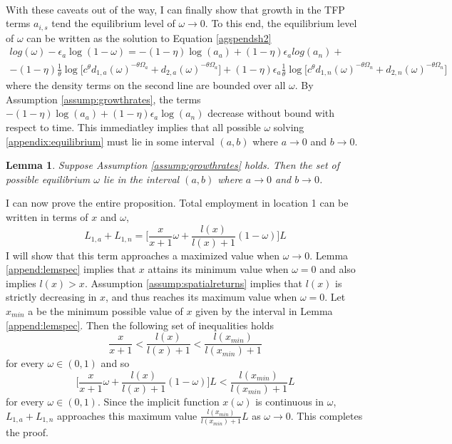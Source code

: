 \documentclass[]{article}
\theoremstyle{plain}
\newtheorem{lem}[thm]{Lemma}
\begin{document}
\paragraph*{}
With these caveats out of the way, I can finally show that growth in the TFP terms $a_{i, s}$ tend the equilibrium level of $\omega \to 0$. To this end, the equilibrium level of $\omega$ can be written as the solution to Equation \eqref{agspendsh2}
\begin{multline}\label{appendix:equilibrium}
log(\omega) - \epsilon_{a}\log(1 -\omega) = -(1-\eta)\log(a_{a}) + (1-\eta)\epsilon_{a}log(a_{n}) + \\ -(1-\eta)\frac{1}{\theta}\log\bigg[c^{\theta}d_{1, a}(\omega)^{-\theta\Omega_{a}} + d_{2, a}(\omega)^{-\theta \Omega_{a}}\bigg] + (1-
\eta)\epsilon_{a}\frac{1}{\theta}\log\bigg[c^{\theta}d_{1, n}(\omega)^{-\theta\Omega_{n}} + d_{2, n}(\omega)^{-\theta \Omega_{n}}\bigg]
\end{multline}
where the density terms on the second line are bounded over all $\omega$. By Assumption \ref{assump:growthrates}, the terms $-(1-\eta)\log(a_{a}) + (1-\eta)\epsilon_{a}\log(a_{n})$ decrease without bound with respect to time. This immediatley implies that all possible $\omega$ solving \eqref{appendix:equilibrium} must lie in some interval $(a, b)$ where $a \to 0$ and $b \to 0$. 
\begin{lem}
	Suppose Assumption \ref{assump:growthrates} holds. Then the set of possible equilibrium $\omega$ lie in the interval $(a, b)$ where $a \to 0$ and $b \to 0$.  
\end{lem}
I can now prove the entire proposition. Total employment in location 1 can be written in terms of $x$ and $\omega$,
\begin{equation}
	L_{1, a} + L_{1, n} = \bigg[\frac{x}{x + 1}\omega + \frac{l(x)}{l(x) + 1}(1-\omega)\bigg]L
\end{equation}
I will show that this term approaches a maximized value when $\omega \to 0$. Lemma \eqref{append:lemspec} implies that $x$ attains its minimum value when $\omega = 0$ and also implies $l(x) > x$. Assumption \ref{assump:spatialreturns} implies that $l(x)$ is strictly decreasing in $x$, and thus reaches its maximum value when $\omega = 0$. Let $x_{min}$ a be the minimum possible value of $x$ given by the interval in Lemma \eqref{append:lemspec}. Then the following set of inequalities holds
\begin{equation}
	\frac{x}{x + 1} < \frac{l(x)}{l(x) + 1} < \frac{l(x_{min})}{l(x_{min}) + 1}
\end{equation}    
for every $\omega \in (0, 1)$ and so
\begin{equation}
\bigg[\frac{x}{x + 1}\omega + \frac{l(x)}{l(x) + 1}(1-\omega)\bigg]L < \frac{l(x_{min})}{l(x_{min}) + 1}L
\end{equation}
for every $\omega \in (0, 1)$. Since the implicit function $x(\omega)$ is continuous in $\omega$, 	$L_{1, a} + L_{1, n}$ approaches this maximum value $\frac{l(x_{min})}{l(x_{min}) + 1}L$ as $\omega \to 0$. This completes the proof. 
\end{document}
